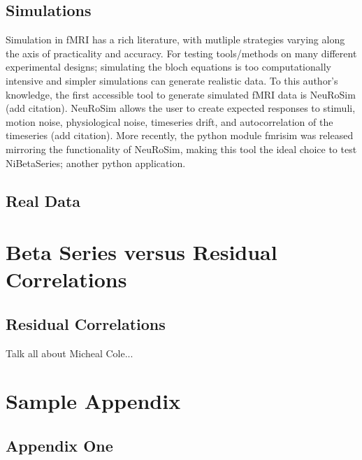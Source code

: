 \documentclass[phd,appendix,figures]{uithesis}
\begin{document}
\section{Simulations}
Simulation in fMRI has a rich literature, with mutliple strategies varying along the axis
of practicality and accuracy.
For testing tools/methods on many different experimental designs; simulating the bloch equations
is too computationally intensive and simpler simulations can generate realistic data.
To this author's knowledge, the first accessible tool to generate simulated fMRI data is NeuRoSim (add citation).
NeuRoSim allows the user to create expected responses to stimuli, motion noise, physiological noise,
timeseries drift, and autocorrelation of the timeseries (add citation).
More recently, the python module fmrisim was released mirroring the functionality of NeuRoSim, making this tool
the ideal choice to test NiBetaSeries; another python application.


\section{Real Data}

\chapter{Beta Series versus Residual Correlations}

\section{Residual Correlations}

Talk all about Micheal Cole...



\appendix

\chapter{Sample Appendix}

\section{Appendix One}
\blindtext
\end{document}

